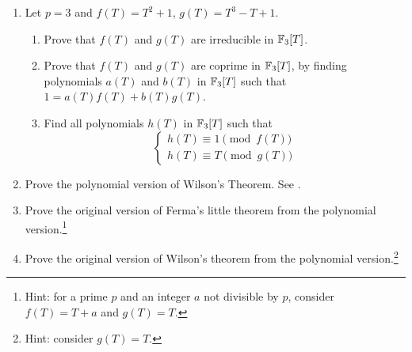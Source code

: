 \begin{enumerate}
    \item Let $p = 3$ and $f(T) = T^2 + 1$, $g(T) = T^3 - T + 1$.
    \begin{enumerate}
        \item Prove that $f(T)$ and $g(T)$ are irreducible in $\mathbb{F}_3[T]$.
        \item Prove that $f(T)$ and $g(T)$ are coprime in $\mathbb{F}_3[T]$, by finding polynomials $a(T)$ and $b(T)$ in $\mathbb{F}_3[T]$ such that $1 = a(T)f(T) + b(T)g(T)$.
        \item Find all polynomials $h(T)$ in $\mathbb{F}_3[T]$ such that 
        \[
        \begin{cases}
            h(T) \equiv 1 \pmod{f(T)} \\
            h(T) \equiv T \pmod{g(T)}
        \end{cases} 
        \]
    \end{enumerate}
    \item Prove the polynomial version of Wilson's Theorem. See \cite[p. 6, Corollary 2]{rosen2013number}.
    \item Prove the original version of Ferma's little theorem from the polynomial version.\footnote{Hint: for a prime $p$ and an integer $a$ not divisible by $p$, consider $f(T) = T + a$ and $g(T) = T$.}
    \item Prove the original version of Wilson's theorem from the polynomial version.\footnote{Hint: consider $g(T) = T$.} 
\end{enumerate}